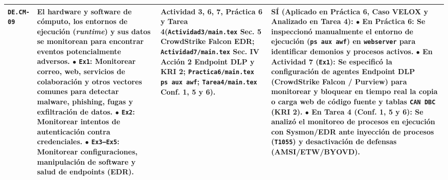\documentclass[letterpaper,11pt]{article}
\begin{document}
\begin{longtable}{|C{1.5cm}|L{5.3cm}|L{4.3cm}|L{5.8cm}|}
\texttt{DE.CM-09} &
\textbf{El hardware y software de cómputo, los entornos de ejecución (\textit{runtime}) y sus datos se monitorean para encontrar eventos potencialmente adversos.}\newline
$\bullet$ \texttt{Ex1}: \textbf{Monitorear correo, web, servicios de colaboración y otros vectores comunes para detectar malware, phishing, fugas y exfiltración de datos}.\newline
$\bullet$ \texttt{Ex2}: Monitorear intentos de autenticación contra credenciales.\newline
$\bullet$ \texttt{Ex3--Ex5}: Monitorear configuraciones, manipulación de software y salud de endpoints (EDR). &
\textbf{Actividad 3, 6, 7, Práctica 6 y Tarea 4}\newline (\texttt{Actividad3/main.tex} Sec. 5 CrowdStrike Falcon EDR; \texttt{Actividad7/main.tex} Sec. IV Acción 2 Endpoint DLP y KRI 2; \texttt{Practica6/main.tex} \texttt{ps aux awf}; \texttt{Tarea4/main.tex} Conf. 1, 5 y 6). &
\textbf{SÍ (Aplicado en Práctica 6, Caso VELOX y Analizado en Tarea 4):}\newline
$\bullet$ \textbf{En Práctica 6:} Se inspeccionó manualmente el entorno de ejecución (\texttt{ps aux awf}) en \texttt{webserver} para identificar demonios y procesos activos.\newline
$\bullet$ \textbf{En Actividad 7 (\texttt{Ex1}):} Se especificó la configuración de agentes \textbf{Endpoint DLP} (CrowdStrike Falcon / Purview) para monitorear y bloquear en tiempo real la copia o carga web de código fuente y tablas \texttt{CAN DBC} (KRI 2).\newline
$\bullet$ \textbf{En Tarea 4 (Conf. 1, 5 y 6):} Se analizó el monitoreo de procesos en ejecución con Sysmon/EDR ante inyección de procesos (\texttt{T1055}) y desactivación de defensas (AMSI/ETW/BYOVD). \\
\hline


\end{longtable}
\end{document}
